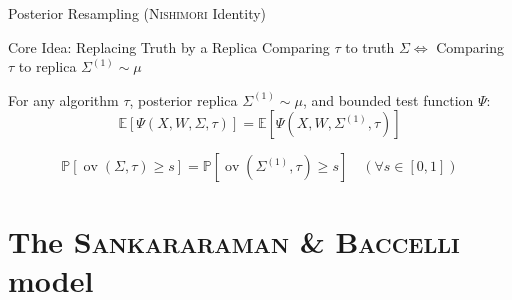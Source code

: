\documentclass[A4,svgnames,9pt,aspectratio=169]{beamer}
\newcommand{\ov}{\operatorname{ov}}
\begin{document}
\begin{frame}{Posterior Resampling (\textsc{Nishimori} Identity)}
  \begin{block}{Core Idea: Replacing Truth by a Replica}
    Comparing $\tau$ to truth $\Sigma \iff$ Comparing $\tau$ to replica $\Sigma^{(1)} \sim \mu$
  \end{block}
  \begin{theorem}
    For any algorithm $\tau$, posterior replica $\Sigma^{(1)} \sim \mu$, and bounded test function $\Psi$:
    $$\mathbb{E}\left[\Psi(X, W, \Sigma, \tau)\right] = \mathbb{E}\left[\Psi(X, W, \Sigma^{(1)}, \tau)\right]$$
  \end{theorem}
  \begin{corollary}
    $$\mathbb{P}\left[\ov(\Sigma, \tau) \ge s\right] = \mathbb{P}\left[\ov(\Sigma^{(1)}, \tau) \ge s\right] \quad (\forall s \in [0, 1])$$
  \end{corollary}
\end{frame}

\section{The \textsc{Sankararaman \& Baccelli} model}
\frame{\sectionpage}
\end{document}
